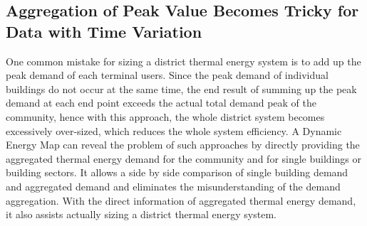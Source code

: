 \subsection{Aggregation of Peak Value Becomes Tricky for Data with
  Time Variation}
One common mistake for sizing a district thermal energy system is to
add up the peak demand of each terminal users. Since the peak demand
of individual buildings do not occur at the same time, the end result
of summing up the peak demand at each end point exceeds the actual
total demand peak of the community, hence with this approach, the
whole district system becomes excessively over-sized, which reduces
the whole system efficiency. A Dynamic Energy Map can reveal the
problem of such approaches by directly providing the aggregated
thermal energy demand for the community and for single buildings or
building sectors. It allows a side by side comparison of single
building demand and aggregated demand and eliminates the
misunderstanding of the demand aggregation. With the direct
information of aggregated thermal energy demand, it also assists
actually sizing a district thermal energy system.



